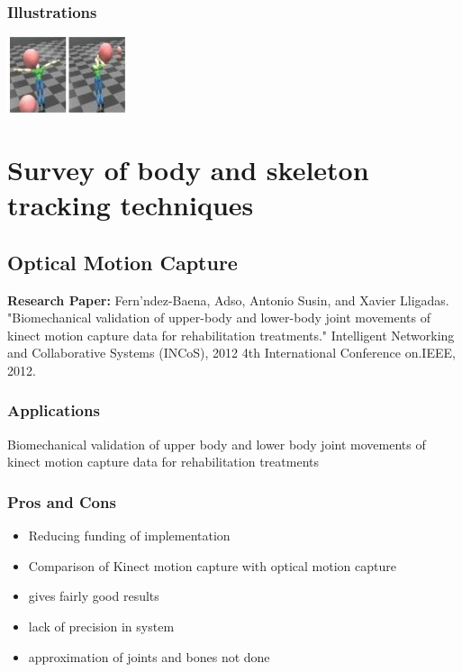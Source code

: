 \documentclass[a4paper,10pt]{report}
\begin{document}
\subsubsection{Illustrations}\newline\newline
\includegraphics{./tech11.png}
\newline\newline



\section{Survey of body and skeleton tracking techniques}

\subsection{Optical Motion Capture}
\textbf{Research Paper:} Fern'ndez-Baena, Adso, Antonio Susin, and Xavier Lligadas. "Biomechanical validation of upper-body and lower-body joint movements of kinect motion capture data for rehabilitation treatments." Intelligent Networking and Collaborative Systems (INCoS), 2012 4th International Conference on.IEEE, 2012.
\subsubsection{Applications}
Biomechanical validation of upper body and lower body joint movements of kinect motion capture data for rehabilitation treatments
\subsubsection{Pros and Cons}
\begin{itemize}
 \item Reducing funding of implementation
 \item Comparison of Kinect motion capture with optical motion capture
 \item gives fairly good results
 \item lack of precision in system
 \item approximation of joints and bones not done
\end{itemize}
\end{document}
